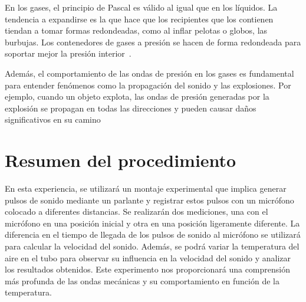\documentclass[twocolumn, 12pt]{article}
\begin{document}
En los gases, el principio de Pascal es válido al igual que
en los líquidos. La tendencia a expandirse es la que hace
que los recipientes que los contienen tiendan a tomar
formas redondeadas, como al inflar pelotas o globos, las
burbujas. Los contenedores de gases a presión se hacen de
forma redondeada para soportar mejor la presión
interior~\cite{Libretexts_2020}.

Además, el comportamiento de las ondas de presión en los
gases es fundamental para entender fenómenos como la
propagación del sonido y las explosiones. Por ejemplo,
cuando un objeto explota, las ondas de presión generadas
por la explosión se propagan en todas las direcciones y
pueden causar daños significativos en su
camino~\cite{ondasdepresion}

\section{Resumen del procedimiento}

En esta experiencia, se utilizará un montaje experimental
que implica generar pulsos de sonido mediante un parlante y
registrar estos pulsos con un micrófono colocado a
diferentes distancias. Se realizarán dos mediciones, una
con el micrófono en una posición inicial y otra en una
posición ligeramente diferente. La diferencia en el tiempo
de llegada de los pulsos de sonido al micrófono se
utilizará para calcular la velocidad del sonido. Además, se
podrá variar la temperatura del aire en el tubo para
observar su influencia en la velocidad del sonido y
analizar los resultados obtenidos. Este experimento nos
proporcionará una comprensión más profunda de las ondas
mecánicas y su comportamiento en función de la temperatura.

\printbibliography
\end{document}
